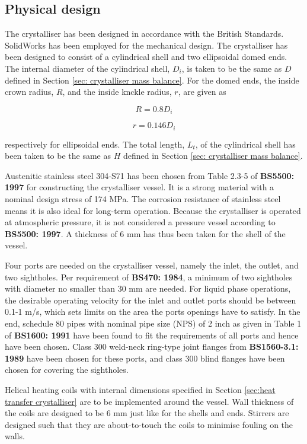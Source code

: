 \subsection{Physical design}

The crystalliser has been designed in accordance with the British Standards.  SolidWorks\textsuperscript{\textregistered} has been employed for the mechanical design. The crystalliser has been designed to consist of a cylindrical shell and two ellipsoidal domed ends. The internal diameter of the cylindrical shell, $D_i$, is taken to be the same as $D$ defined in Section \ref{sec: crystalliser mass balance}. For the domed ends, the inside crown radius, $R$, and the inside knckle radius, $r$, are given as 

\begin{equation}
    R = 0.8 D_i
\end{equation}

\begin{equation}
    r = 0.146 D_i
\end{equation}

\noindent respectively for ellipsoidal ends. The total length, $L_t$, of the cylindrical shell has been taken to be the same as $H$ defined in Section \ref{sec: crystalliser mass balance}. 

Austenitic stainless steel 304-S71 has been chosen from Table 2.3-5 of \textbf{BS5500: 1997} for constructing the crystalliser vessel. It is a strong material with a nominal design stress of 174 MPa. The corrosion resistance of stainless steel means it is also ideal for long-term operation. Because the crystalliser is operated at atmospheric pressure, it is not considered a pressure vessel according to \textbf{BS5500: 1997}. A thickness of 6 mm has thus been taken for the shell of the vessel.

Four ports are needed on the crystalliser vessel, namely the inlet, the outlet, and two sightholes. Per requirement of \textbf{BS470: 1984}, a minimum of two sightholes with diameter no smaller than 30 mm are needed. For liquid phase operations, the desirable operating velocity for the inlet and outlet ports should be between 0.1-1 m/s, which sets limits on the area the ports openings have to satisfy. In the end, schedule 80 pipes with nominal pipe size (NPS) of 2 inch as given in Table 1 of \textbf{BS1600: 1991} have been found to fit the requirements of all ports and hence have been chosen. Class 300 weld-neck ring-type joint flanges from \textbf{BS1560-3.1: 1989} have been chosen for these ports, and class 300 blind flanges have been chosen for covering the sightholes. 

Helical heating coils with internal dimensions specified in Section \ref{sec:heat transfer crystalliser} are to be implemented around the vessel. Wall thickness of the coils are designed to be 6 mm just like for the shells and ends. Stirrers are designed such that they are about-to-touch the coils to minimise fouling on the walls. 

